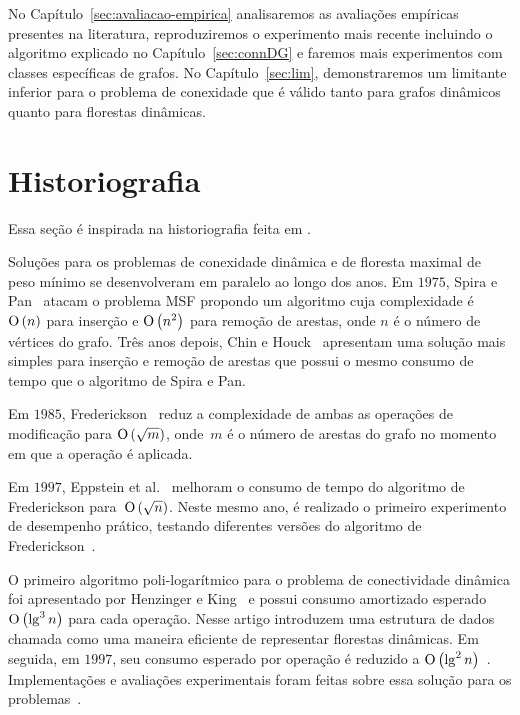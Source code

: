 No Capítulo~\ref{sec:avaliacao-empirica} analisaremos as avaliações empíricas presentes na literatura, reproduziremos o experimento mais recente incluindo o algoritmo explicado no Capítulo~\ref{sec:connDG} e faremos mais experimentos com classes específicas de grafos. No Capítulo~\ref{sec:lim}, demonstraremos um limitante inferior para o problema de conexidade que é válido tanto para grafos dinâmicos quanto para florestas dinâmicas.

\section{Historiografia}

Essa seção é inspirada na historiografia feita em \cite{QC22, HHSRecentAdvances2022, bruceM}.

Soluções para os problemas de conexidade dinâmica e de floresta maximal de peso mínimo se desenvolveram em paralelo ao longo dos anos. Em $1975$, Spira e Pan~\cite{SP1975} atacam o problema MSF propondo um algoritmo cuja complexidade é $\text{O}\left(n\right)$ para inserção e $\text{O}\left(n^2\right)$ para remoção de arestas, onde $n$ é o número de vértices do grafo. Três anos depois, Chin e Houck~\cite{CH1978} apresentam uma solução mais simples para inserção e remoção de arestas que possui o mesmo consumo de tempo que o algoritmo de Spira e Pan.

Em $1985$, Frederickson~\cite{frederickson1983data} reduz a complexidade de ambas as operações de modificação para $\text{O}\left(\sqrt{m}\right)$, onde~$m$ é o número de arestas do grafo no momento em que a operação é aplicada.

Em $1997$, Eppstein et al.~\cite{Eppstein1992SparsificationaTF} melhoram o consumo de tempo do algoritmo de Frederickson para~$\text{O}\left(\sqrt{n}\right)$. Neste mesmo ano, é realizado o primeiro experimento de desempenho prático, testando diferentes versões do algoritmo de Frederickson~\cite{xpAnalyGiuseppe}.

O primeiro algoritmo poli-logarítmico para o problema de conectividade dinâmica foi apresentado por Henzinger e King~\cite{HenzingerKing} e possui consumo amortizado esperado $\text{O}\left(\lg^3 n\right)$ para cada operação. Nesse artigo introduzem uma estrutura de dados chamada  como uma maneira eficiente de representar florestas dinâmicas. Em seguida, em $1997$, seu consumo esperado por operação é reduzido a $\text{O}\left(\lg^2 n\right)$~\cite{HenzingerThorup}.  Implementações e avaliações experimentais foram feitas sobre essa solução para os problemas~\cite{EmpiricalStudy1997, EmpiricalStudy2002, Zaroliagis2002}.

